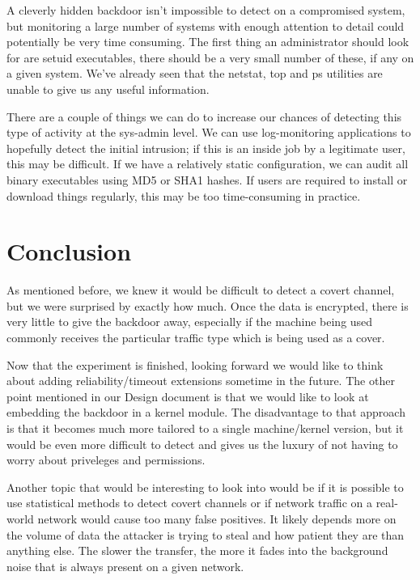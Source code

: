 \documentclass[titlepage]{article}
\begin{document}
A cleverly hidden backdoor isn't impossible to detect on a compromised system, but monitoring a large number of systems with enough attention to detail could potentially be very time consuming.  The first thing an administrator should look for are setuid executables, there should be a very small number of these, if any on a given system.  We've already seen that the netstat, top and ps utilities are unable to give us any useful information. 

There are a couple of things we can do to increase our chances of detecting this type of activity at the sys-admin level. We can use log-monitoring applications to hopefully detect the initial intrusion; if this is an inside job by a legitimate user, this may be difficult.  If we have a relatively static configuration, we can audit all binary executables using MD5 or SHA1 hashes. If users are required to install or download things regularly, this may be too time-consuming in practice.

\section{Conclusion}

As mentioned before, we knew it would be difficult to detect a covert channel, but we were surprised by exactly how much. Once the data is encrypted, there is very little to give the backdoor away, especially if the machine being used commonly receives the particular traffic type which is being used as a cover.

Now that the experiment is finished, looking forward we would like to think about adding reliability/timeout extensions sometime in the future.  The other point mentioned in our Design document is that we would like to look at embedding the backdoor in a kernel module. The disadvantage to that approach is that it becomes much more tailored to a single machine/kernel version, but it would be even more difficult to detect and gives us the luxury of not having to worry about priveleges and permissions.

Another topic that would be interesting to look into would be if it is possible to use statistical methods to detect covert channels or if network traffic on a real-world network would cause too many false positives.  It likely depends more on the volume of data the attacker is trying to steal and how patient they are than anything else.  The slower the transfer, the more it fades into the background noise that is always present on a given network.
\end{document}
